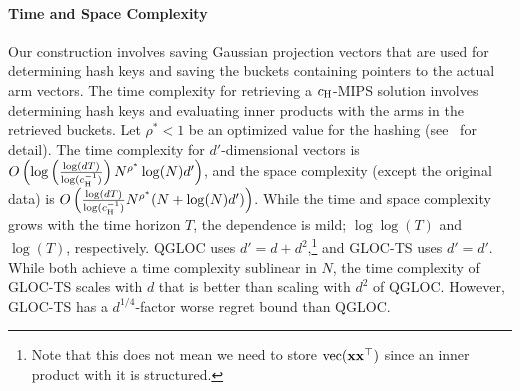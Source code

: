 \vspace{-6pt}
\paragraph{Time and Space Complexity} %

% 
Our construction involves saving Gaussian projection vectors that are used for determining hash keys and saving the buckets containing pointers to the actual arm vectors.
The time complexity for retrieving a $c_\text{\normalfont H}$-MIPS solution involves determining hash keys and evaluating inner products with the arms in the retrieved buckets.
Let $\rho^*<1$ be an optimized value for the hashing (see~\cite{shrivastava14asymmetric} for detail).
The time complexity for $d'$-dimensional vectors is $O\left(\log\left({ \frac{\log(dT)}{\log(c_\text{\normalfont H}^{-1})} }\right) N^{\rho^*} \log(N) d'\right)$, and the space complexity (except the original data) is $O\left({ \frac{\log(dT)}{\log(c_\text{\normalfont H}^{-1})} } N^{\rho^*}(N + \log(N)d')\right)$.
While the time and space complexity grows with the time horizon $T$, the dependence is mild; $\log \log(T)$ and $\log(T)$, respectively.
QGLOC uses $d'=d+d^2$,\footnote{
  Note that this does not mean we need to store $\text{vec}(\mathbf{x}\mathbf{x}^{\top})$ since an inner product with it is structured.
}
  and GLOC-TS uses $d'=d'$.
While both achieve a time complexity sublinear in $N$, the time complexity of GLOC-TS scales with $d$ that is better than scaling with $d^2$ of QGLOC.
However, GLOC-TS has a $d^{1/4}$-factor worse regret bound than QGLOC.

